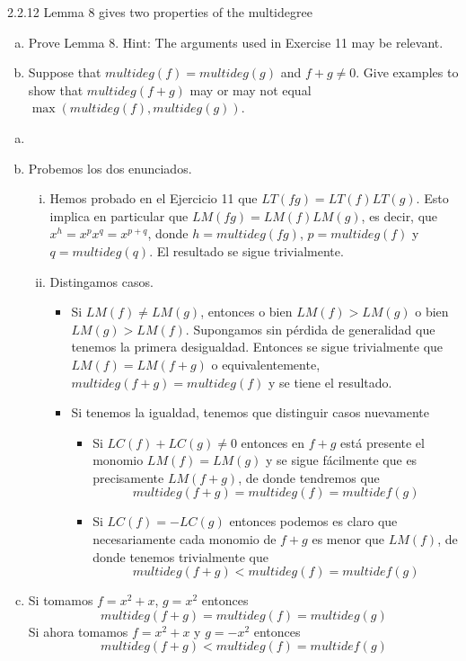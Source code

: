 \documentclass[twoside]{article}
\begin{document}
\newpage
\begin{ejercicio}{2.2.12}
Lemma 8 gives two properties of the multidegree
\begin{enumerate}[a.]
\item Prove Lemma 8. Hint: The arguments used in Exercise 11 may be relevant.
\item Suppose that $multideg( f) = multideg(g)$ and $f +g \neq 0$. Give examples to show that $multideg( f + g)$ may or may not equal $\max(multideg( f ), multideg(g))$.
\end{enumerate}
\end{ejercicio}
\begin{solucion}
\begin{enumerate}[a.]
\item[]
\item Probemos los dos enunciados.
\begin{enumerate}[(i)]
\item Hemos probado en el Ejercicio 11 que $LT(fg)=LT(f)LT(g)$. Esto implica en particular que $LM(fg)=LM(f)LM(g)$, es decir, que $x^h=x^px^q=x^{p+q}$, donde $h=multideg(fg)$, $p=multideg(f)$ y $q=multideg(q)$. El resultado se sigue trivialmente.
\item Distingamos casos.
\begin{itemize}
\item Si $LM(f)\neq LM(g)$, entonces o bien $LM(f)>LM(g)$ o bien $LM(g)>LM(f)$. Supongamos sin pérdida de generalidad que tenemos la primera desigualdad. Entonces se sigue trivialmente que $LM(f)=LM(f+g)$ o equivalentemente, $multideg(f+g)=multideg(f)$ y se tiene el resultado.
\item Si tenemos la igualdad, tenemos que distinguir casos nuevamente
\begin{itemize}
\item Si $LC(f)+LC(g)\neq 0$ entonces en $f+g$ está presente el monomio $LM(f)=LM(g)$ y se sigue fácilmente que es precisamente $LM(f+g)$, de donde tendremos que
$$
multideg(f+g)=multideg(f)=multidef(g)
$$
\item Si $LC(f)=-LC(g)$ entonces podemos es claro que necesariamente cada monomio de $f+g$ es menor que $LM(f)$, de donde tenemos trivialmente que
$$
multideg(f+g)<multideg(f)=multidef(g)
$$
\end{itemize}
\end{itemize}
\end{enumerate}
\item Si tomamos $f=x^2+x$, $g=x^2$ entonces $$multideg(f+g)=multideg(f)=multideg(g)$$
Si ahora tomamos $f=x^2+x$ y $g=-x^2$ entonces 
$$
multideg(f+g)<multideg(f)=multidef(g)
$$
\end{enumerate}
\end{solucion}
\end{document}
